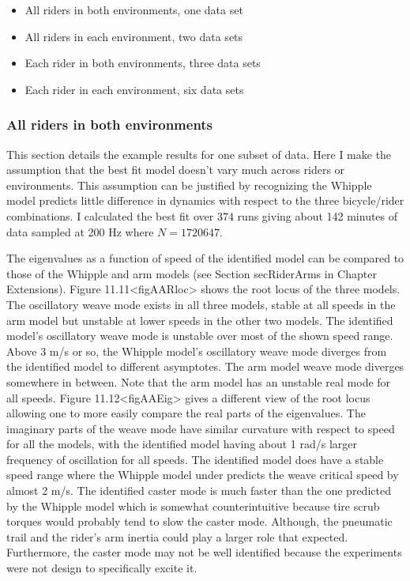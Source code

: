 \documentclass[a4paper]{article}
\begin{document}
\begin{itemize}
  \item
    All riders in both environments, one data set
  \item
    All riders in each environment, two data sets
  \item
    Each rider in both environments, three data sets
  \item
    Each rider in each environment, six data sets
\end{itemize}

\subsubsection{All riders in both environments}

This section details the example results for one subset of data. Here I
make the assumption that the best fit model doesn't vary much across
riders or environments. This assumption can be justified by
recognizing the Whipple model predicts little difference in
dynamics with respect to the three bicycle/rider combinations. I
calculated the best fit over 374 runs giving about 142 minutes of data
sampled at 200 Hz where $N=1720647$.

The eigenvalues as a function of speed of the identified model can be
compared to those of the Whipple and arm models (see Section
secRiderArms in Chapter Extensions).
Figure 11.11\textless{}figAARloc\textgreater{} shows the root locus of
the three models. The oscillatory weave mode exists in all three models,
stable at all speeds in the arm model but unstable at lower
speeds in the other two models. The identified model's oscillatory weave
mode is unstable over most of the shown speed range. Above 3 m/s or so,
the Whipple model's oscillatory weave mode diverges from the identified
model to different asymptotes. The arm model weave mode diverges
somewhere in between. Note that the arm model has an unstable real mode
for all speeds. Figure
11.12\textless{}figAAEig\textgreater{} gives a different view of the
root locus allowing one to more easily compare the real parts of the
eigenvalues. The imaginary parts of the weave mode have similar
curvature with respect to speed for all the models, with the identified
model having about 1 rad/s larger frequency of oscillation for all
speeds. The identified model does have a stable speed range where the
Whipple model under predicts the weave critical speed by almost 2 m/s.
The identified caster mode is much faster than the one predicted by the
Whipple model which is somewhat counterintuitive because tire scrub
torques would probably tend to slow the caster mode. Although, the
pneumatic trail and the rider's arm inertia could play a larger role
that expected. Furthermore, the caster mode may not be well identified
because the experiments were not design to specifically excite it.
\end{document}
